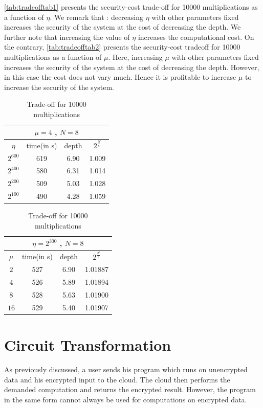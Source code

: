 \documentclass{acm_proc_article-sp}
\begin{document}
\autoref{tab:tradeofftab1} presents the security-cost trade-off for 10000 multiplications as a function of $\eta$. We remark that : decreasing $\eta$ with other parameters fixed increases the security of the system at the cost of decreasing the depth.  We further note that increasing the value of $\eta$ increases the computational cost. On the contrary, \autoref{tab:tradeofftab2} presents the security-cost tradeoff for 10000 multiplications as a function of $\mu$. Here, increasing $\mu$ with other parameters fixed increases the security of the system at the cost of decreasing the depth. However, in this case the cost does not vary much. Hence it is profitable to increase $\mu$ to increase the security of the system.

\begin{table}[htb]
  \centering
  \caption{Trade-off for 10000 multiplications}
\begin{tabular}{|c|c|c|c||}
  \hline
  \multicolumn{4}{|c||}{$\mu = 4$ , $N=8$} \\
  \hline
  $\eta$ &  time(in s)  & depth & $2^{\frac{N}{\epsilon}}$ \\
  \hline
  $2^{600}$ & 619  & 6.90 & 1.009 \\
  $2^{400}$ &  580 & 6.31 & 1.014 \\
  $2^{200}$ &  509 & 5.03 & 1.028 \\
  $2^{100}$ &  490 & 4.28 & 1.059 \\
   \hline
\end{tabular}
\normalsize
\label{tab:tradeofftab1}
\end{table}

\begin{table}[htb]
  \centering
  \caption{Trade-off for 10000 multiplications}
\begin{tabular}{|c|c|c|c||}
  \hline
  \multicolumn{4}{|c||}{$\eta = 2^{300}$ , $N=8$} \\
  \hline
  $\mu$ &  time(in s)  & depth & $2^{\frac{N}{\epsilon}}$ \\
  \hline
  $2$ & 527  & 6.90 & 1.01887 \\
  $4$ & 526 & 5.89 & 1.01894 \\
  $8$ & 528  & 5.63 & 1.01900 \\
  $16$ & 529  & 5.40 & 1.01907 \\
   \hline
\end{tabular}
\normalsize
\label{tab:tradeofftab2}
\end{table}


\section{Circuit Transformation}
As previously discussed, a user sends his program which runs on unencrypted data and his encrypted input to the cloud. The cloud then performs the demanded computation and returns the encrypted result. However, the program in the same form cannot always be used for computations on encrypted data. 
\end{document}
